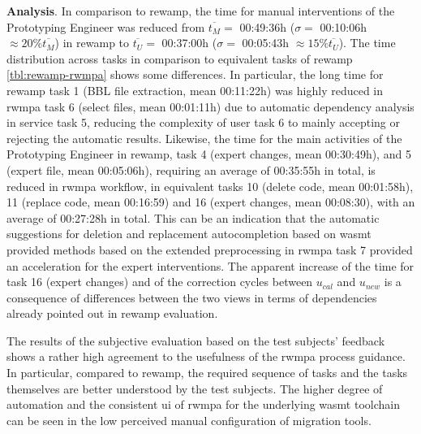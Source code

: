 \textbf{Analysis}.
In comparison to \gls{rewamp}, the time for manual interventions of the Prototyping Engineer was reduced from \(\overline{t_M}=\) 00:49:36h (\(\sigma =\) 00:10:06h \(\approx 20\% \overline{t_M}\)) in \gls{rewamp} to \(\overline{t_U}=\) 00:37:00h (\(\sigma =\) 00:05:43h \(\approx 15\% \overline{t_U}\)).
The time distribution across tasks in comparison to equivalent tasks of \gls{rewamp} \cref{tbl:rewamp-rwmpa} shows some differences.
In particular, the long time for \gls{rewamp} task 1 (BBL file extraction, mean 00:11:22h) was highly reduced in \gls{rwmpa} task 6 (select files, mean 00:01:11h) due to automatic dependency analysis in service task 5, reducing the complexity of user task 6 to mainly accepting or rejecting the automatic results.
Likewise, the time for the main activities of the Prototyping Engineer in \gls{rewamp}, task 4 (expert changes, mean 00:30:49h), and 5 (expert file, mean 00:05:06h), requiring an average of 00:35:55h in total, is reduced in \gls{rwmpa} workflow, in equivalent tasks 10 (delete code, mean 00:01:58h), 11 (replace code, mean 00:16:59) and 16 (expert changes, mean 00:08:30), with an average of 00:27:28h in total.
This can be an indication that the automatic suggestions for deletion and replacement autocompletion based on \gls{wasmt} provided methods based on the extended preprocessing in \gls{rwmpa} task 7 provided an acceleration for the expert interventions.
The apparent increase of the time for task 16 (expert changes) and of the correction cycles between \(u_{cal}\) and \(u_{new}\) is a consequence of differences between the two views in terms of dependencies already pointed out in \gls{rewamp} evaluation.
\vspace{-8pt}

The results of the subjective evaluation based on the test subjects' feedback shows a rather high agreement to the usefulness of the \gls{rwmpa} process guidance.
In particular, compared to \gls{rewamp}, the required sequence of tasks and the tasks themselves are better understood by the test subjects.
The higher degree of automation and the consistent \gls{ui} of \gls{rwmpa} for the underlying \gls{wasmt} toolchain can be seen in the low perceived manual configuration of migration tools.
\vspace{-8pt}

